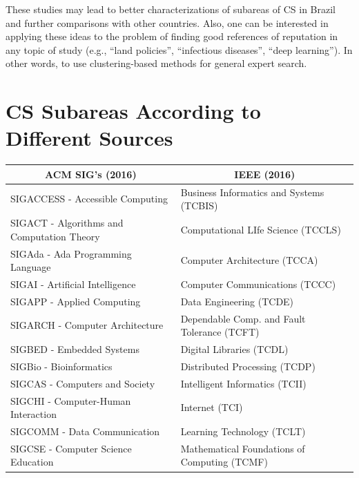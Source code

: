 \documentclass[msc]{ppgccufmg}
\begin{document}
\begin{appendices}
These studies may lead to better characterizations of subareas of CS in Brazil and further comparisons with other countries. Also, one can be interested in applying these ideas to the problem of finding good references of reputation in any topic of study (e.g., ``land policies'', ``infectious diseases'', ``deep learning''). In other words, to use clustering-based methods for general expert search. 

\chapter{CS Subareas According to Different Sources}\label{sec:cs-subareas}
								
\begin{table}[htbp]
\centering
\scriptsize
\begin{tabular}{ll}
\toprule
\multicolumn{1}{c}{ACM SIG's (2016)}						&	\multicolumn{1}{c}{IEEE (2016)}							\\								
\midrule
SIGACCESS - Accessible Computing							&	Business Informatics and Systems (TCBIS)				\\
SIGACT - Algorithms and Computation Theory					&	Computational LIfe Science (TCCLS)						\\
SIGAda - Ada Programming Language							&	Computer Architecture (TCCA)							\\
SIGAI - Artificial Intelligence								&	Computer Communications (TCCC)							\\
SIGAPP - Applied Computing									&	Data Engineering (TCDE)									\\
SIGARCH - Computer Architecture								&	Dependable Comp. and Fault Tolerance (TCFT)			\\
SIGBED - Embedded Systems									&	Digital Libraries (TCDL)								\\
SIGBio - Bioinformatics										&	Distributed Processing (TCDP)							\\
SIGCAS - Computers and Society								&	Intelligent Informatics (TCII)							\\
SIGCHI - Computer-Human Interaction							&	Internet (TCI)											\\
SIGCOMM - Data Communication								&	Learning Technology (TCLT)								\\
SIGCSE - Computer Science Education							&	Mathematical Foundations of Computing (TCMF)			\\

\end{tabular}
\end{table}
\end{appendices}
\end{document}

